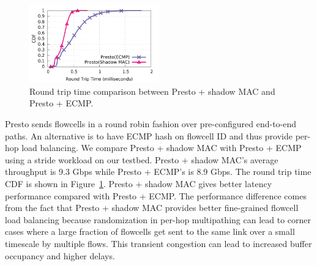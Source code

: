 \begin{figure}[!t]
        \centering
  \includegraphics[width=0.5\textwidth]{presto/figures/presto_compare_2modes/presto_compare_2mods.pdf}
        \caption{Round trip time comparison between Presto + shadow MAC and Presto + ECMP.
		}
        \label{micro_presto_2mods}
\end{figure}

Presto sends flowcells in a round robin fashion over pre-configured end-to-end paths. An alternative is to
have ECMP hash on flowcell ID and thus provide per-hop load balancing. 
We compare Presto + shadow MAC with Presto + ECMP using a stride workload on our testbed. 
Presto + shadow MAC's average throughput is 9.3 Gbps while Presto + ECMP's is 8.9 Gbps.
The round trip time CDF is shown in Figure~\ref{micro_presto_2mods}. 
Presto + shadow MAC gives better latency performance compared with Presto + ECMP. 
The performance difference comes from the fact that Presto + shadow MAC provides 
better fine-grained flowcell load balancing because 
randomization in per-hop multipathing can lead to corner cases where
a large fraction of flowcells get sent to the same link over a small timescale by multiple flows. This transient congestion
can lead to increased buffer occupancy and higher delays.
